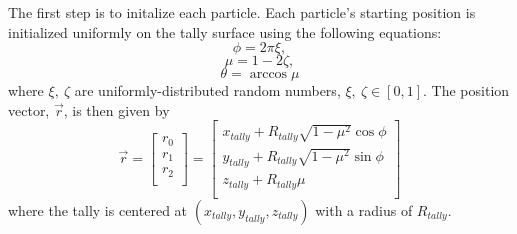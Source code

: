 The first step is to initalize each particle. Each particle's starting position is initialized uniformly on the tally surface using the following equations:
\begin{equation} \label{Eq:pos_phi}
\phi = 2 \pi \xi ,
\end{equation}
\begin{equation}
\mu = 1 - 2 \zeta,
\end{equation}
\begin{equation} \label{Eq:pos_cost}
\theta = \arccos{\mu}
\end{equation}
where $\xi,~\zeta$ are uniformly-distributed random numbers, $\xi,~\zeta \in [0,1]$. The position vector, $\vec{r}$, is then given by
\begin{equation}
\vec{r} =
\begin{bmatrix}  
r_{0} \\
r_{1} \\
r_{2} \\
\end{bmatrix}
=
\begin{bmatrix}  
x_{tally} + R_{tally} \sqrt{1-\mu^{2}}  \cos{\phi}    \\
y_{tally} + R_{tally} \sqrt{1 - \mu^{2}} \sin{\phi}    \\
z_{tally} + R_{tally} \mu 										 \\
\end{bmatrix}
\end{equation}
where the tally is centered at $(x_{tally}, y_{tally}, z_{tally})$ with a radius of $R_{tally}$. 

